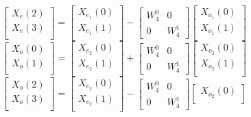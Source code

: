 \documentclass[journal,12pt,twocolumn]{IEEEtran}
\renewcommand\thesection{\arabic{section}}
\begin{document}
\begin{enumerate}[label=\thesection.\arabic*.,ref=\thesection.\theenumi]
\begin{equation}
\begin{bmatrix}
X_{e}(2) \\ 
X_{e}(3)\\ 
\end{bmatrix}
=
\begin{bmatrix}
X_{e_{1}}(0) \\ 
X_{e_{1}}(1)\\ 
\end{bmatrix}
-
\begin{bmatrix}
W^{0}_{4} & 0\\
0 & W^{1}_{4}
\end{bmatrix}
\begin{bmatrix}
X_{o_{1}}(0) \\ 
X_{o_{1}}(1) \\ 
\end{bmatrix}
\end{equation}
\begin{equation}
\begin{bmatrix}
X_{o}(0) \\ 
X_{o}(1)\\ 
\end{bmatrix}
=
\begin{bmatrix}
X_{e_{2}}(0) \\ 
X_{e_{2}}(1)\\ 
\end{bmatrix}
+
\begin{bmatrix}
W^{0}_{4} & 0\\
0 & W^{1}_{4}
\end{bmatrix}
\begin{bmatrix}
X_{o_{2}}(0) \\ 
X_{o_{2}}(1) \\ 
\end{bmatrix}
\end{equation}
\begin{equation}
\begin{bmatrix}
X_{o}(2) \\ 
X_{o}(3)\\ 
\end{bmatrix}
=
\begin{bmatrix}
X_{e_{2}}(0) \\ 
X_{e_{2}}(1)\\ 
\end{bmatrix}
-
\begin{bmatrix}
W^{0}_{4} & 0\\
0 & W^{1}_{4}
\end{bmatrix}
\begin{bmatrix}
X_{o_{2}}(0) \\ 

\end{bmatrix}
\end{equation}
\end{enumerate}
\end{document}

